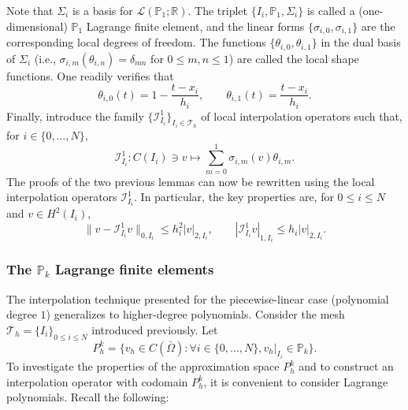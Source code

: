 \documentclass{article}
\begin{document}
Note that $\Sigma_i$ is a basis for $\mathcal{L}(\mathbb{P}_1; \mathbb{R})$. The triplet $\{I_i, \mathbb{P}_1, \Sigma_i\}$ is called a (one-dimensional) $\mathbb{P}_1$ Lagrange finite element, and the linear forms $\{\sigma_{i,0}, \sigma_{i,1}\}$ are the corresponding local degrees of freedom. The functions $\{\theta_{i,0}, \theta_{i,1}\}$ in the dual basis of $\Sigma_i$ (i.e., $\sigma_{i,m}(\theta_{i,n}) = \delta_{mn}$ for $0 \le m, n \le 1$) are called the local shape functions. One readily verifies that
$$ \theta_{i,0}(t) = 1 - \frac{t - x_i}{h_i},\qquad \theta_{i,1}(t) = \frac{t - x_i}{h_i}. $$
Finally, introduce the family $\{\mathcal{I}_{I_i}^1\}_{I_i \in \mathcal{T}_h}$ of local interpolation operators such that, for $i \in \{0, \dots, N\}$,
$$ \mathcal{I}_{I_i}^1: C(I_i) \ni v \mapsto \sum_{m=0}^1 \sigma_{i,m}(v) \theta_{i,m}. $$
The proofs of the two previous lemmas can now be rewritten using the local interpolation operators $\mathcal{I}_{I_i}^1$. In particular, the key properties are, for $0 \le i \le N$ and $v \in H^2(I_i)$,
$$ \|v - \mathcal{I}_{I_i}^1 v\|_{0,I_i} \le h_i^2 |v|_{2,I_i},\qquad|\mathcal{I}_{I_i}^1 v|_{1,I_i} \le h_i |v|_{2,I_i}. $$

\subsubsection{The $\mathbb{P}_k$ Lagrange finite elements}
The interpolation technique presented for the piecewise-linear case (polynomial degree $1$) generalizes to higher-degree polynomials. Consider the mesh $\mathcal{T}_h = \{I_i\}_{0 \le i \le N}$ introduced previously. Let
$$ P_h^k = \{ v_h \in C(\bar{\Omega}): \forall i \in \{0, \dots, N\}, v_h|_{I_i} \in \mathbb{P}_k \}. $$
To investigate the properties of the approximation space $P_h^k$ and to construct an interpolation operator with codomain $P_h^k$, it is convenient to consider Lagrange polynomials. Recall the following:
\end{document}
